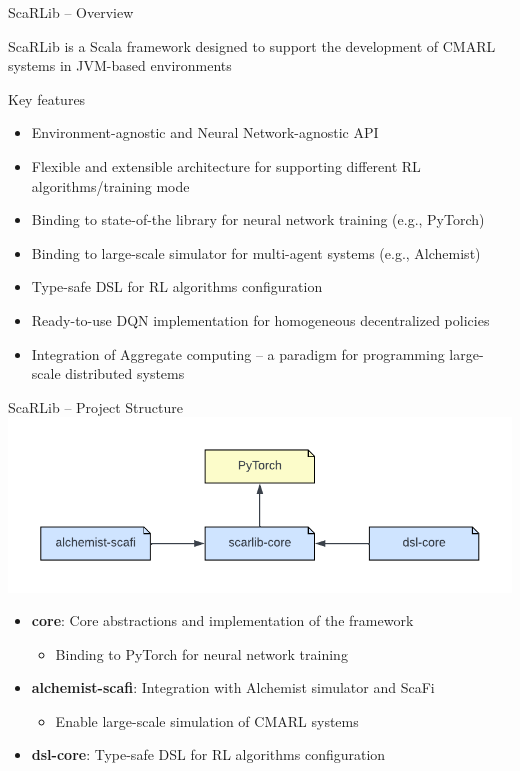 \documentclass[presentation, 9pt]{beamer}\mode<presentation>{\usetheme{AMSBolognaFC}}
\begin{document}
\begin{frame}{ScaRLib -- Overview}
\begin{exampleblock}{}
ScaRLib is a Scala framework designed to support the development of CMARL systems in JVM-based environments
\end{exampleblock}
\begin{alertblock}{Key features}
	\begin{itemize}
		\item Environment-agnostic and Neural Network-agnostic API
		\item Flexible and extensible architecture for supporting different RL algorithms/training mode
		\item Binding to state-of-the library for neural network training (e.g., PyTorch)
		\item Binding to large-scale simulator for multi-agent systems (e.g., Alchemist)
		\item Type-safe DSL for RL algorithms configuration
		\item Ready-to-use DQN implementation for homogeneous decentralized policies
		\item Integration of Aggregate computing -- a paradigm for programming large-scale distributed systems
	\end{itemize}
\end{alertblock}
\end{frame}

\begin{frame}{ScaRLib -- Project Structure}
\includegraphics[width=\textwidth]{img/scarlib-modules.pdf}
\begin{itemize}
	\item \textbf{core}: Core abstractions and implementation of the framework
	\begin{itemize}
		\item Binding to PyTorch for neural network training
	\end{itemize}
	\item \textbf{alchemist-scafi}: Integration with Alchemist simulator and ScaFi
	\begin{itemize}
		\item Enable large-scale simulation of CMARL systems
	\end{itemize}
	\item \textbf{dsl-core}: Type-safe DSL for RL algorithms configuration
\end{itemize}
\end{frame}
\end{document}
